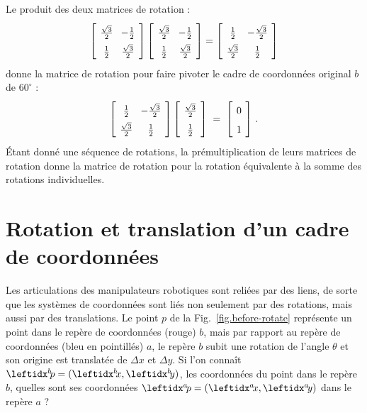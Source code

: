 Le produit des deux matrices de rotation :
\[
\spacearray
\left[\begin{array}{cc}\frac{\sqrt{3}}{2}&-\frac{1}{2}\\\frac{1}{2}&\frac{\sqrt{3}}{2}\end{array}\right]
\left[\begin{array}{cc}\frac{\sqrt{3}}{2}&-\frac{1}{2}\\\frac{1}{2}&\frac{\sqrt{3}}{2}\end{array}\right]=
\left[\begin{array}{cc}\frac{1}{2}&-\frac{\sqrt{3}}{2}\\\frac{\sqrt{3}}{2}&\frac{1}{2}\end{array}\right]
\]
donne la matrice de rotation pour faire pivoter le cadre de coordonnées original $b$ de $60^{\circ}$ :
\[
\spacearray
\left[\begin{array}{cc}\frac{1}{2}&-\frac{\sqrt{3}}{2}\\\frac{\sqrt{3}}{2}&\frac{1}{2}\end{array}\right]
\left[\begin{array}{c}\frac{\sqrt{3}}{2}\\\frac{1}{2}\end{array}\right]\;=\;
\left[\begin{array}{c}0\\1\end{array}\right]\,.
\]
Étant donné une séquence de rotations, la prémultiplication de leurs matrices de rotation donne la matrice de rotation pour la rotation équivalente à la somme des rotations individuelles.

\section{Rotation et translation d'un cadre de coordonnées}\label{s.rotate-translate}

Les articulations des manipulateurs robotiques sont reliées par des liens, de sorte que les systèmes de coordonnées sont liés non seulement par des rotations, mais aussi par des translations. Le point $p$ de la Fig.~\ref{fig.before-rotate} représente un point dans le repère de coordonnées (rouge) $b$, mais par rapport au repère de coordonnées (bleu en pointillés) $a$, le repère $b$ subit une rotation de l'angle $\theta$ et son origine est translatée de $\Delta x$ et $\Delta y$. Si l'on connaît $\bp=(\bx,\by)$, les coordonnées du point dans le repère $b$, quelles sont ses coordonnées $\ap=(\ax,\ay)$ dans le repère $a$ ?

